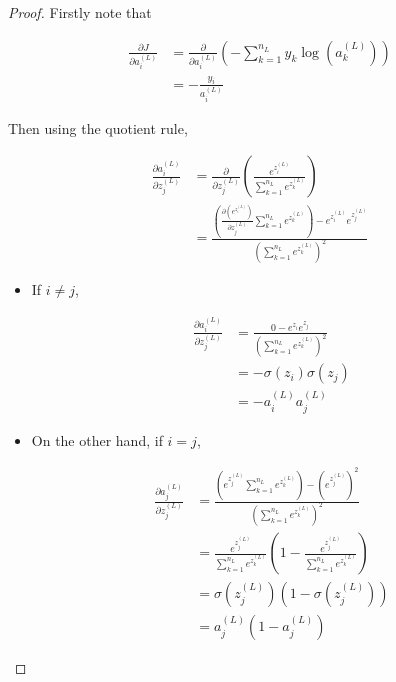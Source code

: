 \documentclass{article}[11pt]
\begin{document}
        
        \begin{proof}
            
            Firstly note that
            
            $$ \begin{aligned}
            \frac{\partial J}{\partial a^{(L)}_i}
            &= \frac{\partial}{\partial a^{(L)}_i} \left( - \sum_{k=1}^{n_L} y_k \log(a^{(L)}_k) \right) \\
            &= - \frac{y_i}{a^{(L)}_i}
            \end{aligned} $$
            
            
            Then using the quotient rule,
            
            $$ \begin{aligned}
            \frac{\partial a^{(L)}_i}{\partial z^{(L)}_j}
            &= \frac{\partial}{\partial z^{(L)}_j} \left( \frac{e^{z^{(L)}_i}}{\sum_{k=1}^{n_L} e^{z^{(L)}_k}} \right) \\
            &= \frac{\left( \frac{\partial \left( e^{z^{(L)}_i}\right)}{\partial z^{(L)}_j} \sum_{k=1}^{n_L} e^{z^{(L)}_k} \right) - e^{z^{(L)}_i} e^{z^{(L)}_j}}{\left( \sum_{k=1}^{n_L} e^{z^{(L)}_k} \right)^2}
            \end{aligned} $$
            
            \begin{itemize}
            
                \item If $i \neq j$,
            
                $$ \begin{aligned}
                \frac{\partial a^{(L)}_i}{\partial z^{(L)}_j}
                &= \frac{0 - e^{z_i} e^{z_j}}{\left( \sum_{k=1}^{n_L} e^{z^{(L)}_k} \right)^2} \\
                &= - \sigma(z_i) \sigma(z_j) \\
                &= - a^{(L)}_i a^{(L)}_j
                \end{aligned} $$
            
                \item On the other hand, if $i = j$,
            
                $$ \begin{aligned}
                \frac{\partial a^{(L)}_j}{\partial z^{(L)}_j}
                &= \frac{\left( e^{z^{(L)}_j} \sum_{k=1}^{n_L} e^{z^{(L)}_k} \right) - \left( e^{z^{(L)}_j} \right)^2}{\left( \sum_{k=1}^{n_L} e^{z^{(L)}_k} \right)^2} \\
                &= \frac{e^{z^{(L)}_j}}{\sum_{k=1}^{n_L} e^{z^{(L)}_k}} \left( 1 - \frac{e^{z^{(L)}_j}}{\sum_{k=1}^{n_L} e^{z^{(L)}_k}} \right) \\
                &= \sigma(z^{(L)}_j) \left( 1 - \sigma(z^{(L)}_j) \right) \\
                &= a^{(L)}_j \left( 1 - a^{(L)}_j \right)
                \end{aligned} $$
            

\end{itemize}
\end{proof}
\end{document}
